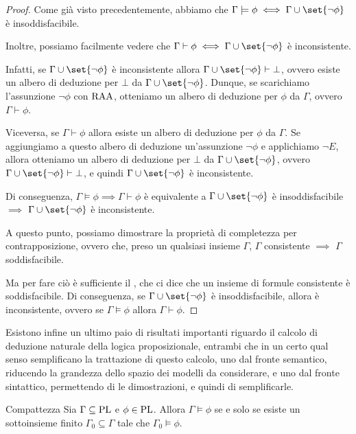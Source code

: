\begin{proof}
  Come già visto precedentemente, abbiamo che \(\Gamma\models\phi \iff \Gamma \cup \set{\neg\phi}\) è insoddisfacibile.

  Inoltre, possiamo facilmente vedere che \(\Gamma\vdash \phi \iff \Gamma \cup \set{\neg\phi}\) è inconsistente.

  Infatti, se \(\Gamma \cup \set{\neg\phi}\) è inconsistente allora \(\Gamma \cup \set{\neg\phi}\vdash \bot\), ovvero esiste un albero di deduzione per \(\bot\) da \(\Gamma \cup \set{\neg\phi}\). Dunque, se scarichiamo l'assunzione \(\neg\phi\) con \(\operatorname{RAA}\), otteniamo un albero di deduzione per \(\phi\) da \(\Gamma\), ovvero \(\Gamma\vdash\phi\).

  Viceversa, se \(\Gamma\vdash\phi\) allora esiste un albero di deduzione per \(\phi\) da \(\Gamma\). Se aggiungiamo a questo albero di deduzione un'assunzione \(\neg\phi\) e applichiamo \(\neg E\), allora otteniamo un albero di deduzione per \(\bot\) da \(\Gamma \cup \set{\neg\phi}\), ovvero \(\Gamma \cup \set{\neg\phi}\vdash\bot\), e quindi \(\Gamma \cup \set{\neg\phi}\) è inconsistente.

  Di conseguenza, \(\Gamma\models\phi \implies \Gamma\vdash\phi\) è equivalente a \(\Gamma \cup \set{\neg\phi}\) è insoddisfacibile \(\implies\) \(\Gamma \cup \set{\neg\phi}\) è inconsistente.

  A questo punto, possiamo dimostrare la proprietà di completezza per contrapposizione, ovvero che, preso un qualsiasi insieme \(\Gamma\), \(\Gamma\) consistente \(\implies\) \(\Gamma\)soddisfacibile.

  Ma per fare ciò è sufficiente il , che ci dice che un insieme di formule consistente è soddisfacibile. Di conseguenza, se \(\Gamma\cup\set{\neg\phi}\) è insoddisfacibile, allora è inconsistente, ovvero se \(\Gamma\models\phi\) allora \(\Gamma\vdash\phi\).
\end{proof}

Esistono infine un ultimo paio di risultati importanti riguardo il calcolo di deduzione naturale della logica proposizionale, entrambi che in un certo qual senso semplificano la trattazione di questo calcolo, uno dal fronte semantico, riducendo la grandezza dello spazio dei modelli da considerare, e uno dal fronte sintattico, permettendo di  le dimostrazioni, e quindi di semplificarle.

\begin{theorem}{Compattezza}
  Sia \(\Gamma \subseteq \operatorname{PL}\) e \(\phi \in \operatorname{PL}\). Allora \(\Gamma \models \phi\) se e solo se esiste un sottoinsieme finito \(\Gamma_0 \subseteq \Gamma\) tale che \(\Gamma_0 \models \phi\).
\end{theorem}

